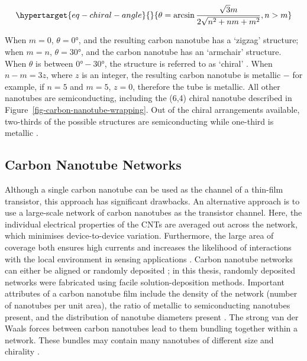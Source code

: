 \documentclass[
  a4paper,
]{scrbook}
\begin{document}
\begin{equation}\protect\hypertarget{eq-chiral-angle}{}{
\theta = \arcsin\frac{\sqrt{3}m}{2\sqrt{n^2+nm+m^2}}, \space n > m
}\label{eq-chiral-angle}\end{equation}

When \(m=0\), \(\theta = 0°\), and the resulting carbon nanotube has a
`zigzag' structure; when \(m=n\), \(\theta = 30°\), and the carbon
nanotube has an `armchair' structure. When \(\theta\) is between
\(0°-30°\), the structure is referred to as `chiral'
\autocite{Dekker1999,Lu2012}. When \(n-m=3z\), where \(z\) is an
integer, the resulting carbon nanotube is metallic \(-\) for example, if
\(n=5\) and \(m=5\), \(z=0\), therefore the tube is metallic. All other
nanotubes are semiconducting, including the (6,4) chiral nanotube
described in Figure~\ref{fig-carbon-nanotube-wrapping}. Out of the
chiral arrangements available, two-thirds of the possible structures are
semiconducting while one-third is metallic \autocite{Dekker1999}.

\hypertarget{carbon-nanotube-networks}{%
\subsection{Carbon Nanotube Networks}\label{carbon-nanotube-networks}}

Although a single carbon nanotube can be used as the channel of a
thin-film transistor, this approach has significant drawbacks. An
alternative approach is to use a large-scale network of carbon nanotubes
as the transistor channel. Here, the individual electrical properties of
the CNTs are averaged out across the network, which minimises
device-to-device variation. Furthermore, the large area of coverage both
ensures high currents and increases the likelihood of interactions with
the local environment in sensing applications
\autocite{Hu2004,Cao2009,Murugathas2019a,Li2023}. Carbon nanotube
networks can either be aligned or randomly deposited
\autocite{Cao2009,Shkodra2021}; in this thesis, randomly deposited
networks were fabricated using facile solution-deposition methods.
Important attributes of a carbon nanotube film include the density of
the network (number of nanotubes per unit area), the ratio of metallic
to semiconducting nanotubes present, and the distribution of nanotube
diameters present \autocite{Cao2009,Shkodra2021}. The strong van der
Waals forces between carbon nanotubes lead to them bundling together
within a network. These bundles may contain many nanotubes of different
size and chirality \autocite{Fuhrer2000,Hu2004,Cao2009,Murugathas2019a}.
\end{document}
